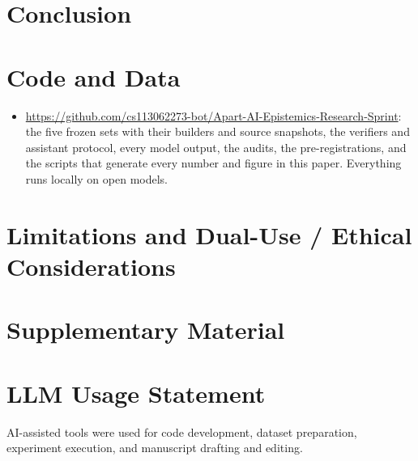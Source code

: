 \documentclass[11pt,letterpaper]{article}
\begin{document}
\section{Conclusion}
\ConclusionText

\section*{Code and Data}
\begin{itemize}[leftmargin=1.2em,itemsep=1pt,topsep=2pt]
\item \url{https://github.com/cs113062273-bot/Apart-AI-Epistemics-Research-Sprint}: the five frozen sets with their builders and source snapshots, the verifiers and assistant protocol, every model output, the audits, the pre-registrations, and the scripts that generate every number and figure in this paper. Everything runs locally on open models.
\end{itemize}




\appendix
\section{Limitations and Dual-Use / Ethical Considerations}
\label{app:ethics}
\EthicsText

\section{Supplementary Material}
\SupplementText

\section*{LLM Usage Statement}
AI-assisted tools were used for code development, dataset preparation, experiment execution, and manuscript drafting and editing.
\end{document}
